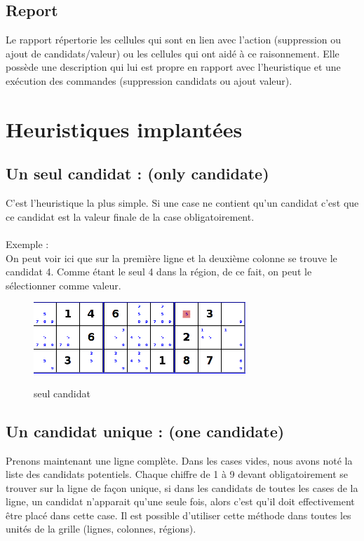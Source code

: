 \subsection{Report}
Le rapport répertorie les cellules qui sont en lien avec l'action (suppression ou ajout de candidats/valeur) ou les cellules
qui ont aidé à ce raisonnement. Elle possède une description qui lui est propre en rapport avec l'heuristique et 
une exécution des commandes (suppression candidats ou ajout valeur).

\section{Heuristiques implantées}
\subsection{Un seul candidat : (only candidate)}
C'est l'heuristique la plus simple. Si une case ne contient qu'un candidat c'est que ce candidat est la valeur 
finale de la case obligatoirement.\\
\\

Exemple : \\
On peut voir ici que sur la première ligne et la deuxième colonne se trouve le candidat 4.
Comme étant le seul 4 dans la région, de ce fait, on peut le sélectionner comme valeur.\\

\begin{figure}[ht]
  \caption{\label{annexe1} seul candidat}
  \includegraphics [width=80mm]{images/only-candidate.png} \\[0.5cm]
\end{figure}

\newpage

\subsection{Un candidat unique : (one candidate)}
Prenons maintenant une ligne complète. Dans les cases vides, nous avons noté la liste des candidats potentiels. 
Chaque chiffre de 1 à 9 devant obligatoirement se trouver sur la ligne de façon unique, si dans les candidats 
de toutes les cases de la ligne, un candidat n'apparait qu'une seule fois, alors c'est qu'il doit effectivement 
être placé dans cette case.
Il est possible d'utiliser cette méthode dans toutes les unités de la grille (lignes, colonnes, régions).

